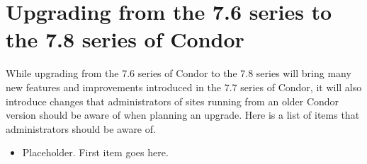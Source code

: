 \section{\label{sec:gotchas}Upgrading from the 7.6 series to the 7.8 series of Condor}

While upgrading from the 7.6 series of Condor to the 7.8 series will
bring many new features and improvements introduced in the 7.7 series of
Condor, it will also introduce changes that administrators of sites
running from an older Condor version should be aware of when
planning an upgrade.
Here is a list of items that administrators should be aware of.

\begin{itemize}

\item  Placeholder.  First item goes here.

\end{itemize}

